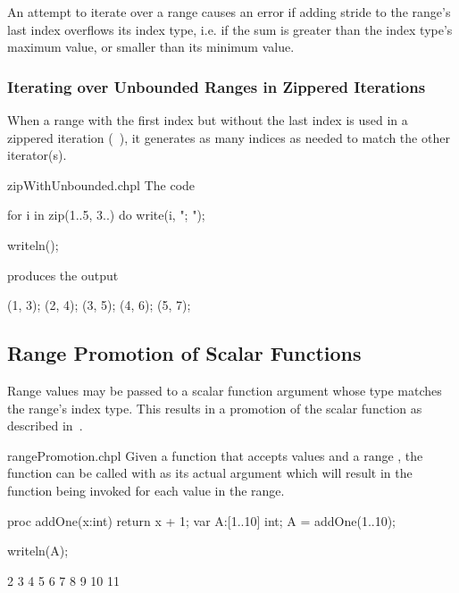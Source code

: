 \begin{craychapel}
An attempt to iterate over a range causes an error if adding stride to
the range's last index overflows its index type, i.e. if the sum is
greater than the index type's maximum value, or smaller than its
minimum value.
\end{craychapel}

\subsubsection{Iterating over Unbounded Ranges in Zippered Iterations}
\label{Iterating_over_Unbounded_Ranges_in_Zippered_Iterations}

When a range with the first index but without the last index is used
in a zippered iteration (~),
it generates as many indices as needed
to match the other iterator(s).

\begin{chapelexample}{zipWithUnbounded.chpl}
The code
\begin{chapel}
for i in zip(1..5, 3..) do
  write(i, "; ");
\end{chapel}
\begin{chapelpost}
writeln();
\end{chapelpost}
produces the output 
\begin{chapelprintoutput}{}
(1, 3); (2, 4); (3, 5); (4, 6); (5, 7); 
\end{chapelprintoutput}
\end{chapelexample}

\subsection{Range Promotion of Scalar Functions}
\label{Range_Promotion_of_Scalar_Functions}

Range values may be passed to a scalar function argument whose type
matches the range's index type.  This results in a promotion of the
scalar function as described in~.

\begin{chapelexample}{rangePromotion.chpl}
Given a function  that accepts  values and
a range , the function  can be called with
 as its actual argument which will result in the function
being invoked for each value in the range.

\begin{chapel}
proc addOne(x:int) {
  return x + 1;
}
var A:[1..10] int;
A = addOne(1..10);
\end{chapel}
\begin{chapelpost}
writeln(A);
\end{chapelpost}
\begin{chapeloutput}
2 3 4 5 6 7 8 9 10 11
\end{chapeloutput}

\end{chapelexample}


